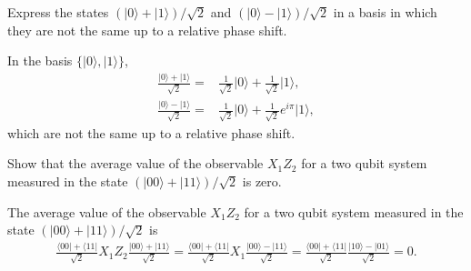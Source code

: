 \documentclass[en]{sol-man}
\begin{document}
\begin{exe}
    Express the states $(\lvert 0\rangle+\lvert 1\rangle)/\sqrt{2}$ and $(\lvert 0\rangle-\lvert 1\rangle)/\sqrt{2}$ in a basis in which they are not the same up to a relative phase shift.
\end{exe}
\begin{sol}
    In the basis $\{\lvert 0\rangle,\lvert 1\rangle\}$,
    \begin{align}
        \frac{\lvert 0\rangle+\lvert 1\rangle}{\sqrt{2}}=&\frac{1}{\sqrt{2}}\lvert 0\rangle+\frac{1}{\sqrt{2}}\lvert 1\rangle,\\
        \frac{\lvert 0\rangle-\lvert 1\rangle}{\sqrt{2}}=&\frac{1}{\sqrt{2}}\lvert 0\rangle+\frac{1}{\sqrt{2}}e^{i\pi}\lvert 1\rangle,
    \end{align}
    which are not the same up to a relative phase shift.
\end{sol}

\begin{exe}
    Show that the average value of the observable $X_1Z_2$ for a two qubit system measured in the state $(\lvert 00\rangle+\lvert 11\rangle)/\sqrt{2}$ is zero.
\end{exe}
\begin{pf}
    The average value of the observable $X_1Z_2$ for a two qubit system measured in the state $(\lvert 00\rangle+\lvert 11\rangle)/\sqrt{2}$ is
    \begin{align}
        \frac{\langle 00\rvert+\langle 11\rvert}{\sqrt{2}}X_1Z_2\frac{\lvert 00\rangle+\lvert 11\rangle}{\sqrt{2}}=\frac{\langle 00\rvert+\langle 11\rvert}{\sqrt{2}}X_1\frac{\lvert 00\rangle-\lvert 11\rangle}{\sqrt{2}}=\frac{\langle 00\rvert+\langle 11\rvert}{\sqrt{2}}\frac{\lvert 10\rangle-\lvert 01\rangle}{\sqrt{2}}=0.
    \end{align}
\end{pf}
\end{document}
